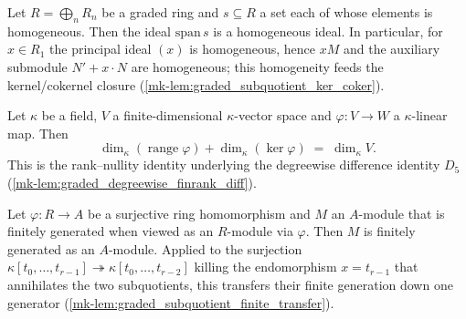 \begin{lemma}
  \label{mk-lem:ideal_homogeneous_span_mathlib}
  \mathlibok

  Let \(R = \bigoplus_n R_n\) be a graded ring and \(s \subseteq R\) a set each of
  whose elements is homogeneous. Then the ideal \(\mathrm{span}\,s\) is a
  homogeneous ideal. In particular, for \(x \in R_1\) the principal ideal \((x)\)
  is homogeneous, hence \(xM\) and the auxiliary submodule \(N' + x \cdot N\) are
  homogeneous; this homogeneity feeds the kernel/cokernel closure
  (\ref{mk-lem:graded_subquotient_ker_coker}).
\end{lemma}

\begin{lemma}
  \label{mk-lem:finrank_range_add_finrank_ker_mathlib}
  \mathlibok

  Let \(\kappa\) be a field, \(V\) a finite-dimensional \(\kappa\)-vector space and
  \(\varphi : V \to W\) a \(\kappa\)-linear map. Then
  \[
    \dim_\kappa(\operatorname{range}\varphi) + \dim_\kappa(\ker\varphi)
      \;=\; \dim_\kappa V .
  \]
  This is the rank--nullity identity underlying the degreewise difference identity
  \(D_5\) (\ref{mk-lem:graded_degreewise_finrank_diff}).
\end{lemma}

\begin{lemma}
  \label{mk-lem:fg_restrictScalars_of_surjective_mathlib}
  \mathlibok

  Let \(\varphi : R \to A\) be a surjective ring homomorphism and \(M\) an
  \(A\)-module that is finitely generated when viewed as an \(R\)-module via
  \(\varphi\). Then \(M\) is finitely generated as an \(A\)-module. Applied to the
  surjection \(\kappa[t_0, \dots, t_{r-1}] \twoheadrightarrow \kappa[t_0, \dots,
  t_{r-2}]\) killing the endomorphism \(x = t_{r-1}\) that annihilates the two
  subquotients, this transfers their finite generation down one generator
  (\ref{mk-lem:graded_subquotient_finite_transfer}).
\end{lemma}

